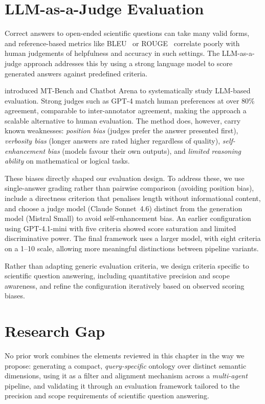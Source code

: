 \section{LLM-as-a-Judge Evaluation}
\label{sec:rw-llm-judge}

Correct answers to open-ended scientific questions can take many valid forms, and reference-based metrics like BLEU~\citep{papineni2002bleu} or ROUGE~\citep{lin2004rouge} correlate poorly with human judgements of helpfulness and accuracy in such settings. The LLM-as-a-judge approach addresses this by using a strong language model to score generated answers against predefined criteria.

\citet{zheng2023judging} introduced MT-Bench and Chatbot Arena to systematically study LLM-based evaluation. Strong judges such as GPT-4 match human preferences at over 80\% agreement, comparable to inter-annotator agreement, making the approach a scalable alternative to human evaluation. The method does, however, carry known weaknesses: \emph{position bias} (judges prefer the answer presented first), \emph{verbosity bias} (longer answers are rated higher regardless of quality), \emph{self-enhancement bias} (models favour their own outputs), and \emph{limited reasoning ability} on mathematical or logical tasks.

These biases directly shaped our evaluation design. To address these, we use single-answer grading rather than pairwise comparison (avoiding position bias), include a directness criterion that penalises length without informational content, and choose a judge model (Claude Sonnet~4.6) distinct from the generation model (Mistral Small) to avoid self-enhancement bias. An earlier configuration using GPT-4.1-mini with five criteria showed score saturation and limited discriminative power. The final framework uses a larger model, with eight criteria on a 1--10 scale, allowing more meaningful distinctions between pipeline variants.

Rather than adapting generic evaluation criteria, we design criteria specific to scientific question answering, including quantitative precision and scope awareness, and refine the configuration iteratively based on observed scoring biases.

\section{Research Gap}
\label{sec:rw-gap}

No prior work combines the elements reviewed in this chapter in the way we propose: generating a compact, \emph{query-specific} ontology over distinct semantic dimensions, using it as a filter and alignment mechanism across a \emph{multi-agent} pipeline, and validating it through an evaluation framework tailored to the precision and scope requirements of scientific question answering.
